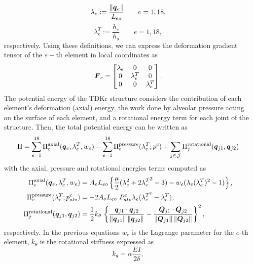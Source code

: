 \documentclass[preprint,3p,12pt,number,sort&compress]{elsarticle}
\def\vec   #1{\text{\boldmath $#1$}{}}
\def\ten   #1{\text{\boldmath $#1$}{}}
\begin{document}
\begin{equation}
	\lambda_e := \frac{\| \vec q_e \| }{L_{eo}} \qquad e=1,18,
\end{equation}
\begin{equation}
	\lambda_e^T := \frac{h_e}{h_o} \qquad e=1,18,
\end{equation}
respectively. Using these definitions, we can express the deformation gradient tensor of the $e-$th element in local coordinates as
\begin{equation}
	\ten F_e = 
	\begin{bmatrix}
		\lambda_e		&	0	&	0\\
		0	&	\lambda_e^T	&	0\\
		0	&	0	&	\lambda_e^T
	\end{bmatrix}.
	\label{eq:Ftruss}
\end{equation}
The potential energy of the TDKr structure considers the contribution of each element's deformation (axial) energy, the work done by alveolar pressure acting on the surface of each element, and a rotational energy term for each joint of the structure. Then, the total potential energy can be written as
\begin{equation}
	\Pi = \sum_{e=1}^{18} \Pi_e^{\rm axial} (\vec q_e, \lambda^T_e, w_e ) -  \sum_{e=1}^{18} \Pi^{\rm pressure}_{e} (\lambda^T_e; p^c) + \sum_{j \in \mathcal J} \Pi^{\rm rotational}_{j}(\vec q_{j1}, \vec q_{j2})
\end{equation}
with the axial, pressure and rotational energies terms computed as \cite{concha2020upscaling}
\begin{align}
	\Pi^{\rm axial}_e(\vec q_e, \lambda_e^T, w_e) &  = A_{o} L_{eo} \left\{ \frac{\mu}{2} (\lambda_e^2 + 2{\lambda_e^T}^2 - 3) - w_e(\lambda_e (\lambda_e^T)^2 - 1) \right\}, \\
	\Pi^{\rm pressure}_e( \lambda_e^T; p_{alv}^c) &= - 2 A_o L_{eo} \ P_{alv}^c  \lambda_e (\lambda_e^{T^2} - \lambda_e^T),\\
\Pi^{\rm rotational}_{j}(\vec q_{j1},\vec q_{j2}) &= \frac{1}{2} k_{\theta} \, \left\{  \frac{\vec q_{j1} \cdot \vec q_{j2}}{\| \vec q_{j1} \| \, \| \vec q_{j2} \|} - \frac{\vec Q_{j1} \cdot \vec Q_{j2}}{\| \vec Q_{j1} \| \, \| \vec Q_{j2} \|} \right\}^2 ,	
\end{align}
respectively. In the previous equations $w_e$ is the Lagrange parameter for the $e$-th element, $k_{\theta}$ is the rotational stiffness expressed as
\begin{equation}
	k_{\theta} = \alpha \frac{EI}{2 \delta},
\end{equation}
\end{document}
